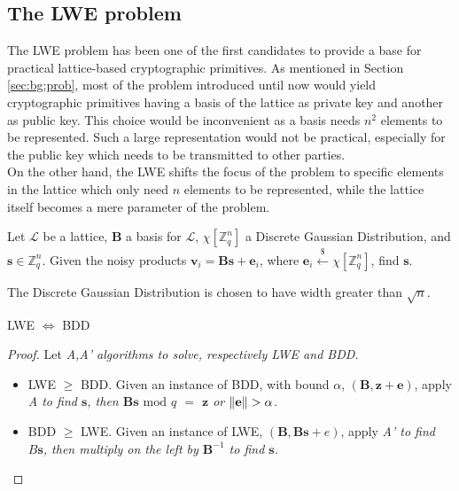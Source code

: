 \subsection{The LWE problem}
The LWE problem has been one of the first candidates to provide a base for practical lattice-based cryptographic primitives. As mentioned in Section \ref{sec:bg:prob}, most of the problem introduced until now would yield cryptographic primitives having a basis of the lattice as private key and another as public key. This choice would be inconvenient as a basis needs $n^2$ elements to be represented. Such a large representation would not be practical, especially for the public key which needs to be transmitted to other parties.\\
On the other hand, the LWE shifts the focus of the problem to specific elements in the lattice which only need $n$ elements to be represented, while the lattice itself becomes a mere parameter of the problem.\\

\begin{definition}
Let $\mathscr{L}$ be a lattice, $\mathbf{B}$ a basis for $\mathscr{L}$, $\chi[\mathbb{Z}_q^n]$ a Discrete Gaussian Distribution, and $\mathbf{s}\in\mathbb{Z}_q^n$. Given the noisy products $\mathbf{v}_i=\mathbf{Bs} + \mathbf{e}_i$, where $\mathbf{e}_i\xleftarrow{\$}\chi[\mathbb{Z}_q^n]$, find $\mathbf{s}$.
\end{definition}

\begin{remark}
The Discrete Gaussian Distribution is chosen to have width greater than $\sqrt{n}$.
\end{remark}

\begin{theorem}
LWE $\Leftrightarrow$ BDD
\end{theorem}
\begin{proof}
Let \it{A},\it{A'} algorithms to solve, respectively LWE and BDD.
\begin{itemize}
\item LWE $\geq$ BDD. Given an instance of BDD, with bound $\alpha$, $(\mathbf{B},\mathbf{z}+\mathbf{e})$, apply \it{A} to find $\mathbf{s}$, then $\mathbf{Bs}$ $\mathrm{mod}$ $q$ $=$ $\mathbf{z}$ or $\left\lVert \mathbf{e} \right\rVert>\alpha$.
\item BDD $\geq$ LWE. Given an instance of LWE, $(\mathbf{B},\mathbf{Bs}+e)$, apply \it{A'} to find $B\mathbf{s}$, then multiply on the left by $\mathbf{B}^{-1}$ to find $\mathbf{s}$.
\end{itemize}
\end{proof}

